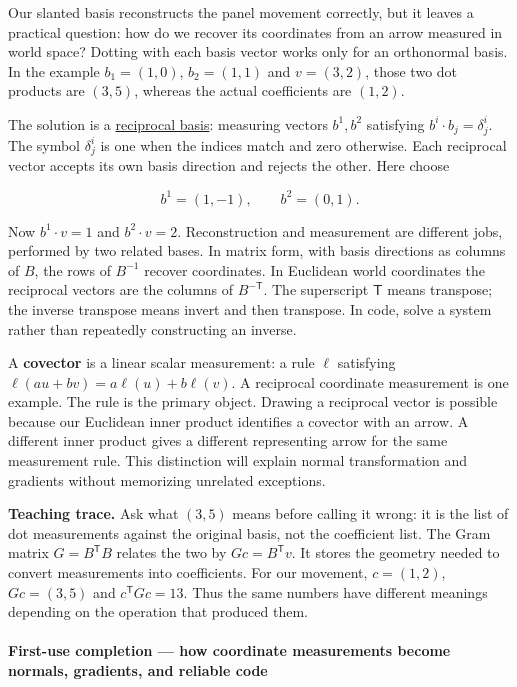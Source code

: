 Our slanted basis reconstructs the panel movement correctly, but it leaves a practical question: how do we recover its coordinates from an arrow measured in world space? Dotting with each basis vector works only for an orthonormal basis. In the example \(b_1=(1,0)\), \(b_2=(1,1)\) and \(v=(3,2)\), those two dot products are \((3,5)\), whereas the actual coefficients are \((1,2)\).

The solution is a \hyperref[appendix-6b3d696dd902]{reciprocal basis}: measuring vectors \(b^1,b^2\) satisfying \(b^i\cdot b_j=\delta^i_j\). The symbol \(\delta^i_j\) is one when the indices match and zero otherwise. Each reciprocal vector accepts its own basis direction and rejects the other. Here choose

\[
b^1=(1,-1),\qquad b^2=(0,1).
\]

Now \(b^1\cdot v=1\) and \(b^2\cdot v=2\). Reconstruction and measurement are different jobs, performed by two related bases. In matrix form, with basis directions as columns of \(B\), the rows of \(B^{-1}\) recover coordinates. In Euclidean world coordinates the reciprocal vectors are the columns of \(B^{-\mathsf T}\). The superscript \(\mathsf T\) means transpose; the inverse transpose means invert and then transpose. In code, solve a system rather than repeatedly constructing an inverse.

A \textbf{covector} is a linear scalar measurement: a rule \(\ell\) satisfying \(\ell(au+bv)=a\ell(u)+b\ell(v)\). A reciprocal coordinate measurement is one example. The rule is the primary object. Drawing a reciprocal vector is possible because our Euclidean inner product identifies a covector with an arrow. A different inner product gives a different representing arrow for the same measurement rule. This distinction will explain normal transformation and gradients without memorizing unrelated exceptions.

\textbf{Teaching trace.} Ask what \((3,5)\) means before calling it wrong: it is the list of dot measurements against the original basis, not the coefficient list. The Gram matrix \(G=B^{\mathsf T}B\) relates the two by \(Gc=B^{\mathsf T}v\). It stores the geometry needed to convert measurements into coefficients. For our movement, \(c=(1,2)\), \(Gc=(3,5)\) and \(c^{\mathsf T}Gc=13\). Thus the same numbers have different meanings depending on the operation that produced them.

\paragraph{First-use completion --- how coordinate measurements become normals, gradients, and reliable code}\label{01-foundations-i-ch017-first-use-completion-how-coordinate-measurements-become-normals-gradients-and-reliable-code}

